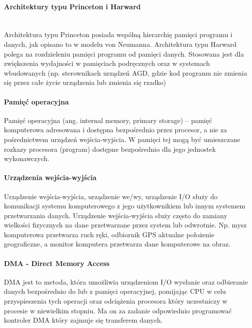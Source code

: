 \documentclass[]{report}
\begin{document}
\medskip 
\paragraph{Architektury typu Princeton i Harward \\\\}


Architektura typu Princeton posiada wspólną hierarchię pamięci programu i danych, jak opisano to w modelu von
Neumanna. Architektura typu Harward polega na rozdzieleniu pamięci programu od pamięci danych. Stosowana
jest dla zwiększenia wydajności w pamięciach podręcznych oraz w systemach wbudowanych (np. sterownikach
urządzeń AGD, gdzie kod programu nie zmienia się przez całe życie urządzenia lub zmienia się rzadko)

\paragraph{Pamięć operacyjna}

Pamięć operacyjna (ang. internal memory, primary storage) – pamięć komputerowa adresowana i dostępna bezpośrednio przez procesor, a nie za pośrednictwem urządzeń wejścia-wyjścia. W pamięci tej mogą być umieszczane rozkazy procesora (program) dostępne bezpośrednio dla jego jednostek wykonawczych.

\paragraph{Urządzenia wejścia-wyjścia} 

Urządzenie wejścia-wyjścia, urządzenie we/wy, urządzenie I/O służy do komunikacji systemu komputerowego z jego użytkownikiem lub innym systemem przetwarzania danych. Urządzenie wejścia-wyjścia służy często do zamiany wielkości fizycznych na dane przetwarzane przez system lub odwrotnie. Np. mysz komputerowa przetwarza ruch ręki, odbiornik GPS aktualne położenie geograficzne, a monitor komputera przetwarza dane komputerowe na obraz.

\paragraph{DMA - Direct Memory Access}

DMA jest to metoda, która umożliwia urządzeniom I/O wysłanie oraz odbieranie danych bezpośrednio do lub z pamięci operacyjnej, pomijając CPU w celu przyspieszenia tych operacji oraz odciążenia procesora który uczestniczy w procesie w niewielkim stopniu. Ma on za zadanie odpowiednio programować kontroler DMA który zajmuje się transferem danych. 
\end{document}
